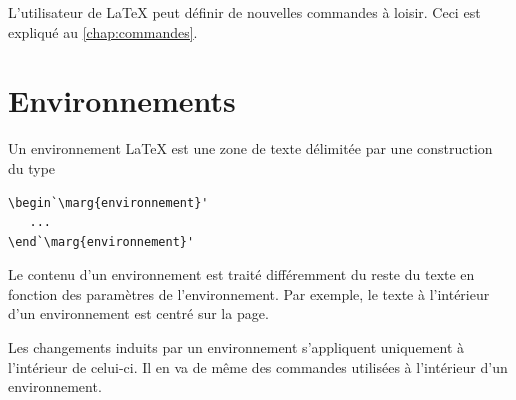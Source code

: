L'utilisateur de {\LaTeX} peut définir de nouvelles commandes à
loisir. Ceci est expliqué au \autoref{chap:commandes}.


\section{Environnements}
\label{sec:bases:environnements}

Un environnement {\LaTeX} est une zone de texte délimitée par une
construction du type
\begin{lstlisting}
\begin`\marg{environnement}'
   ...
\end`\marg{environnement}'
\end{lstlisting}
Le contenu d'un environnement est traité différemment du reste du
texte en fonction des paramètres de l'environnement. Par exemple, le
texte à l'intérieur d'un environnement  est centré sur la
page.

Les changements induits par un environnement s'appliquent uniquement à
l'intérieur de celui-ci. Il en va de même des commandes utilisées à
l'intérieur d'un environnement.

